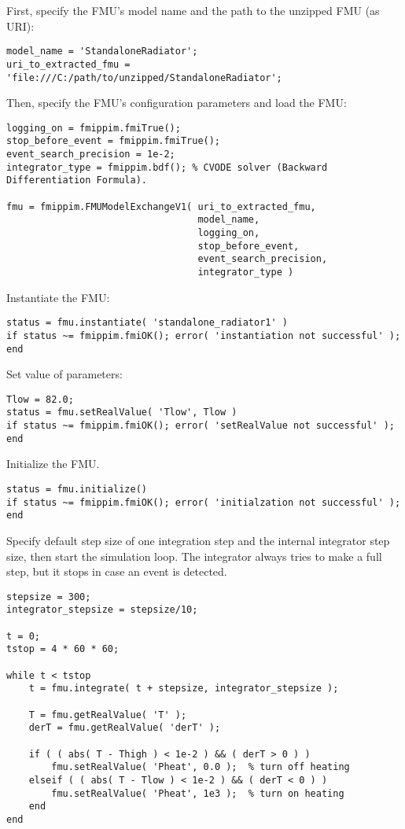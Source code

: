 First, specify the FMU's model name and the path to the unzipped FMU (as URI):
\begin{verbatim}
model_name = 'StandaloneRadiator';
uri_to_extracted_fmu = 'file:///C:/path/to/unzipped/StandaloneRadiator';
\end{verbatim}
Then, specify the FMU's configuration parameters and load the FMU:
\begin{verbatim}
logging_on = fmippim.fmiTrue();
stop_before_event = fmippim.fmiTrue();
event_search_precision = 1e-2;
integrator_type = fmippim.bdf(); % CVODE solver (Backward Differentiation Formula).

fmu = fmippim.FMUModelExchangeV1( uri_to_extracted_fmu,
                                  model_name,
                                  logging_on,
                                  stop_before_event,
                                  event_search_precision,
                                  integrator_type )
\end{verbatim}
Instantiate the FMU:
\begin{verbatim}
status = fmu.instantiate( 'standalone_radiator1' )
if status ~= fmippim.fmiOK(); error( 'instantiation not successful' ); end
\end{verbatim}
Set value of parameters:
\begin{verbatim}
Tlow = 82.0;
status = fmu.setRealValue( 'Tlow', Tlow )
if status ~= fmippim.fmiOK(); error( 'setRealValue not successful' ); end
\end{verbatim}
Initialize the FMU.
\begin{verbatim}
status = fmu.initialize()
if status ~= fmippim.fmiOK(); error( 'initialzation not successful' ); end
\end{verbatim}
Specify default step size of one integration step and the internal integrator step size, then start the simulation loop. The integrator always tries to make a full step, but it stops in case an event is detected.
\begin{verbatim}
stepsize = 300;
integrator_stepsize = stepsize/10;

t = 0;
tstop = 4 * 60 * 60;

while t < tstop
    t = fmu.integrate( t + stepsize, integrator_stepsize );

    T = fmu.getRealValue( 'T' );
    derT = fmu.getRealValue( 'derT' );

    if ( ( abs( T - Thigh ) < 1e-2 ) && ( derT > 0 ) )
        fmu.setRealValue( 'Pheat', 0.0 );  % turn off heating
    elseif ( ( abs( T - Tlow ) < 1e-2 ) && ( derT < 0 ) )
        fmu.setRealValue( 'Pheat', 1e3 );  % turn on heating
    end
end
\end{verbatim}
	
